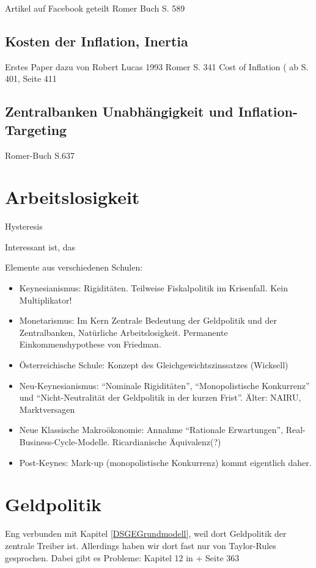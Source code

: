 Artikel auf Facebook geteilt
Romer Buch S. 589


\subsection{Kosten der Inflation, Inertia}
Erstes Paper dazu von Robert Lucas 1993
Romer S. 341
Cost of Inflation (\textcite{Snowdon2005} ab S. 401, Seite 411 

\subsection{Zentralbanken Unabhängigkeit und Inflation-Targeting}
Romer-Buch S.637


\section{Arbeitslosigkeit}
Hysteresis







Interessant ist, das

Elemente aus verschiedenen Schulen:
\begin{itemize}
	\item Keynesianismus: Rigiditäten. Teilweise Fiskalpolitik im Krisenfall. Kein Multiplikator!
	\item Monetarismus: Im Kern \textcite{Friedman1968}
	Zentrale Bedeutung der Geldpolitik und der Zentralbanken, Natürliche Arbeitslosigkeit. Permanente Einkommenshypothese von Friedman.
	\item Österreichische Schule: Konzept des Gleichgewichtszinssatzes (Wicksell)
	\item Neu-Keynesianismus: "`Nominale Rigiditäten"', "`Monopolistische Konkurrenz"' und "`Nicht-Neutralität der Geldpolitik in der kurzen Frist"'. Älter: NAIRU, Marktversagen
	\item Neue Klassische Makroökonomie: Annahme "`Rationale Erwartungen"', Real-Business-Cycle-Modelle. Ricardianische Äquivalenz(?)
	\item Post-Keynes: Mark-up (monopolistische Konkurrenz) kommt eigentlich daher.
\end{itemize}

\section{Geldpolitik}
\label{Geldpolitik}

Eng verbunden mit Kapitel \ref{DSGEGrundmodell}, weil dort Geldpolitik der zentrale Treiber ist. Allerdings haben wir dort fast nur von Taylor-Rules gesprochen. Dabei gibt es Probleme: Kapitel 12 in \textcite{Romer2019} + Seite 363

